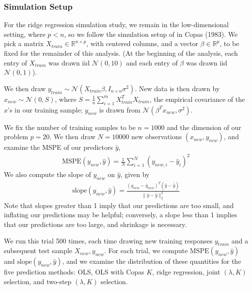 \documentclass[main]{subfiles}
\begin{document}
\subsubsection{Simulation Setup}
For the ridge regression simulation study, we remain in the low-dimensional setting, where $p < n$, so
we follow the simulation setup of in Copas (1983). We pick a matrix $X_{train} \in \mathbb{R}^{n \times p}$,
with centered columns, and a vector
$\beta \in \mathbb{R}^p$, to be fixed for the remainder of this analysis. (At the beginning of the analysis,
each entry of $X_{train}$ was drawn
iid $\mathcal{N}(0, 10)$ and each entry of
$\beta$ was drawn iid $\mathcal{N}(0, 1)$).

We then draw $y_{train} \sim \mathcal{N}(X_{train}\beta, I_{n\times n}\sigma^2)$. New data is then drawn by
$x_{new} \sim \mathcal{N}(0, S)$, where $S = \frac{1}{n}\sum_{i=1}^m X_{train}^T X_{train}$, the empirical
covariance of the $x$'s in our training sample; $y_{new}$ is drawn from $\mathcal{N}(\beta^T x_{new}, \sigma^2)$.

We fix the number of training samples to be $n = 1000$ and the dimension of our problem $p = 20$. We then draw
$N = 10000$ new observations $(x_{new}, y_{new})$, and examine the MSPE of our predictors $\hat y$,
\begin{align}
	\text{MSPE}(y_{new}, \hat y) = \frac{1}{N}\sum_{i=1}^{N}(y_{new, i} - \hat y_i)^2
\end{align}
We also compute the slope of $y_{new}$ on $\hat y$,
given by
\begin{align}
	\text{slope}(y_{new}, \hat y) = \frac{(y_{new} - \bar y_{new})^T (\hat y - \bar{\hat y})}{\|\hat y - \bar{\hat y}\|^2_2}
\end{align}
Note that slopes greater than 1 imply that our predictions are too small, and inflating our predictions may be helpful;  conversely,
a slope less than 1 implies that our predictions are too large, and shrinkage is necessary.

We run this trial 500 times, each time drawing new training responses $y_{train}$ and a subsequent test sample
$X_{new}, y_{new}$. For each trial, we compute $\text{MSPE}(y_{new}, \hat y)$
 and $\text{slope}(y_{new}, \hat y)$, and we examine the distribution of these quantities for the five prediction methods:
 OLS, OLS with Copas $K$, ridge regression, joint $(\lambda, K)$ selection, and two-step $(\lambda, K)$ selection.

\end{document}
